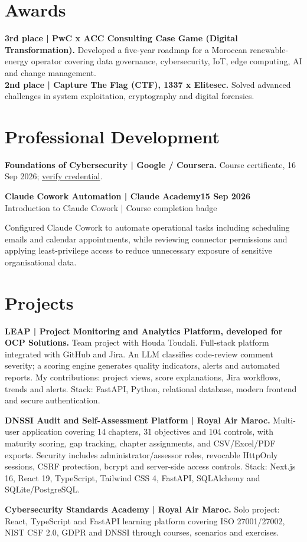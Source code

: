 \documentclass[10pt,a4paper]{article}
\newcommand{\CVEntry}[4]{%
  \textbf{#1}\hfill\textbf{#2}\\[-1pt]
  \textcolor{Quiet}{#3}\hfill\textcolor{Quiet}{#4}\par
}
\newcommand{\Project}[2]{\textbf{#1} #2\par}
\begin{document}
\section*{Awards}
\textbf{3rd place | PwC x ACC Consulting Case Game (Digital Transformation).}
Developed a five-year roadmap for a Moroccan renewable-energy operator covering data governance, cybersecurity, IoT, edge computing, AI and change management.\\[-1pt]
\textbf{2nd place | Capture The Flag (CTF), 1337 x Elitesec.}
Solved advanced challenges in system exploitation, cryptography and digital forensics.

\section*{Professional Development}
\textbf{Foundations of Cybersecurity | Google / Coursera.} Course certificate, 16 Sep 2026; \href{https://coursera.org/verify/DJ57Z0D29JGE}{verify credential}.\par
\CVEntry{Claude Cowork Automation | Claude Academy}{15 Sep 2026}{Introduction to Claude Cowork | Course completion badge}{}
Configured Claude Cowork to automate operational tasks including scheduling emails and calendar appointments, while reviewing connector permissions and applying least-privilege access to reduce unnecessary exposure of sensitive organisational data.

\section*{Projects}
\Project{LEAP | Project Monitoring and Analytics Platform, developed for OCP Solutions.}{Team project with Houda Toudali. Full-stack platform integrated with GitHub and Jira. An LLM classifies code-review comment severity; a scoring engine generates quality indicators, alerts and automated reports. My contributions: project views, score explanations, Jira workflows, trends and alerts. Stack: FastAPI, Python, relational database, modern frontend and secure authentication.}
\vspace{1pt}
\Project{DNSSI Audit and Self-Assessment Platform | Royal Air Maroc.}{Multi-user application covering 14 chapters, 31 objectives and 104 controls, with maturity scoring, gap tracking, chapter assignments, and CSV/Excel/PDF exports. Security includes administrator/assessor roles, revocable HttpOnly sessions, CSRF protection, bcrypt and server-side access controls. Stack: Next.js 16, React 19, TypeScript, Tailwind CSS 4, FastAPI, SQLAlchemy and SQLite/PostgreSQL.}
\vspace{1pt}
\Project{Cybersecurity Standards Academy | Royal Air Maroc.}{Solo project: React, TypeScript and FastAPI learning platform covering ISO 27001/27002, NIST CSF 2.0, GDPR and DNSSI through courses, scenarios and exercises.}
\end{document}
